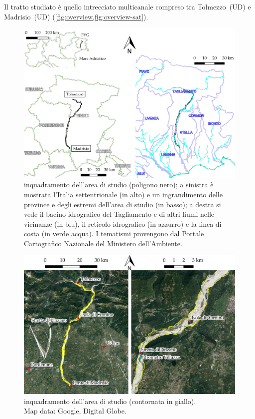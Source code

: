 Il tratto studiato è quello intrecciato multicanale compreso tra Tolmezzo~(UD) e Madrisio~(UD) (\cref{fig:overview,fig:overview-sat}). 
%
\begin{figure}
	\centering
	\includegraphics[width=\textwidth]{files/overview.jpeg}
	\caption[inquadramento dell'area di studio]
		{inquadramento dell'area di studio (poligono nero); a sinistra è mostrata l'Italia settentrionale (in alto) e un ingrandimento delle province e degli estremi dell'area di studio (in basso); a destra si vede il bacino idrografico del Tagliamento e di altri fiumi nelle vicinanze (in blu), il reticolo idrografico (in azzurro) e la linea di costa (in verde acqua). I tematismi provengono dal Portale Cartografico Nazionale del Ministero dell'Ambiente.}
	\label{fig:overview}
\end{figure}
%
\begin{figure}
	\centering
	\includegraphics[width=\textwidth]{files/overview_tratto_sat.jpeg}
	\caption[inquadramento dell'area di studio]{inquadramento dell'area di studio (contornata in giallo).
	\\
	Map data: Google, Digital Globe.}
	\label{fig:overview-sat}
\end{figure}
